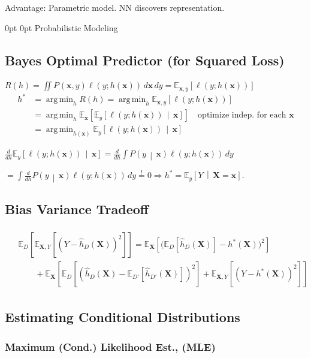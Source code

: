 \documentclass[a4paper,8pt,landscape]{extarticle}
\makeatletter
\newcommand{\Prob}[2][]{P_{#1}\left( #2 \right)}
\newcommand{\cProb}[2]{P\left( #1 \,\middle|\, #2 \right)}
\newcommand{\Exp}[2][]{{\mathbb{E}_{#1}}\left[ #2
\right]}
\newcommand{\cExp}[3][]{{\mathbb{E}}_{#1}\left[ #2
\,\middle|\, #3 \right]}
\DeclareMathOperator*{\argmin}{arg\,min}
\newcommand{\mbeq}{\stackrel{!}{=}}
\newcommand{\mat}[1]{\mathbf{#1}}
\renewcommand{\vec}[1]{\mathbf{#1}}
\newcommand{\vx}{\vec{x}}
\newcommand{\MX}{\mat{X}}
\newcommand*{\mybox}[1]{%
    \noindent\colorbox{sectionbarcolor}{%
        \parbox{\dimexpr\columnwidth-2\fboxsep\relax}{%
            \textcolor{white}{#1}}}}
\newcommand*{\mybox}[1]{%
    \noindent\colorbox{sectioncolor}{%
        \parbox{\dimexpr\columnwidth-2\fboxsep\relax}{%
            \textcolor{white}{#1}}}}
\renewcommand\section{\@startsection {section}{1}{\z@}%
                                   {0pt}%
                                   {0pt}%
                                   {\normalfont\bfseries\mybox}}
\makeatother
\begin{document}
\begin{multicols*}{3}
\Com Advantage: Parametric model. NN discovers representation.

\section{Probabilistic Modeling}

\subsection{Bayes Optimal Predictor (for Squared Loss)}

$R(h)=\iint \Prob{\vx,y}\ell(y;h(\vx))\,d\vx\,dy=\Exp[\vx,y]{\ell(y;h(\vx))}$
\begin{align*}
h^*&=\textstyle\argmin_h R(h)=\argmin_h \Exp[\vx,y]{\ell(y;h(\vx))}\\
&=\textstyle\argmin_h \Exp[\vx]{\cExp[y]{\ell(y;h(\vx))}{\vx}} \quad
\text{optimize indep.
for each }\vx \\
&=\textstyle\argmin_{h(\vx)}\cExp[y]{\ell(y;h(\vx))}{\vx}
\end{align*}

$\frac{d}{dh}\cExp[y]{\ell(y;h(\vx))}{\vx}
=\frac{d}{dh}\int \cProb{y}{\vx}\ell(y;h(\vx)) \, dy$

$=\int \frac{d}{dh}\cProb{y}{\vx}\ell(y;h(\vx)) \, dy
\mbeq 0 \Longrightarrow h^*=\cExp[y]{Y}{\MX=\vx}.$

\subsection{Bias Variance Tradeoff}
\begin{gather*}
\begin{flalign*}
&\Exp[D]{
 \Exp[\MX,Y]{(Y-\hat{h}_D(\MX))^2}
}
=\Exp[\MX]{
\Big(
\Exp[D]{\hat{h}_D(\MX)}-
h^*(\MX)
\Big)^2}\\
&\qquad+\Exp[\MX]{
\Exp[D]{\left(\hat{h}_D(\MX)-\Exp[D']{\hat{h}_{D'}(\MX)}\right)^2}
+\Exp[\MX,Y]{\left(Y-h^*(\MX)\right)^2}}&
\end{flalign*}
\end{gather*}
\subsection{Estimating Conditional Distributions}

\subsubsection{Maximum (Cond.) Likelihood Est., (MLE)}


\end{multicols*}
\end{document}
